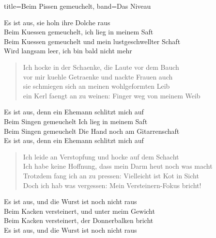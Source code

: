 \begin{song}{title=Beim Pissen gemeuchelt, band=Das Niveau}
        \begin{chorus}
            Es ist aus, sie holn ihre Dolche raus \\
            Beim Kuessen gemeuchelt, ich lieg in meinem Saft \\
            Beim Kuessen gemeuchelt und mein lustgeschwellter Schaft \\
            Wird langsam leer, ich bin bald nicht mehr \\
        \end{chorus}

        \begin{verse}
            Ich hocke in der Schaenke, die Laute vor dem Bauch \\
            vor mir kuehle Getraenke und nackte Frauen auch \\
            sie schmiegen sich an meinen wohlgeformten Leib \\
            ein Kerl faengt an zu weinen: Finger weg von meinem Weib \\
        \end{verse}

        \begin{chorus}
            Es ist aus, denn ein Ehemann schlitzt mich auf \\
            Beim Singen gemeuchelt Ich lieg in meinem Saft \\
            Beim Singen gemeuchelt Die Hand noch am Gitarrenschaft \\
            Es ist aus, denn ein Ehemann schlitzt mich auf \\
        \end{chorus}

        \begin{verse}
            Ich leide an Verstopfung und hocke auf dem Schacht \\
            Ich habe keine Hoffnung, dass mein Darm heut noch was macht \\
            Trotzdem fang ich an zu pressen: Vielleicht ist Kot in Sicht \\
            Doch ich hab was vergessen: Mein Versteinern-Fokus bricht! \\
        \end{verse}

        \begin{chorus}
            Es ist aus, und die Wurst ist noch nicht raus \\
            Beim Kacken versteinert, und unter meim Gewicht \\
            Beim Kacken versteinert, der Donnerbalken bricht \\
            Es ist aus, und die Wurst ist noch nicht raus \\
        \end{chorus}
\end{song}
